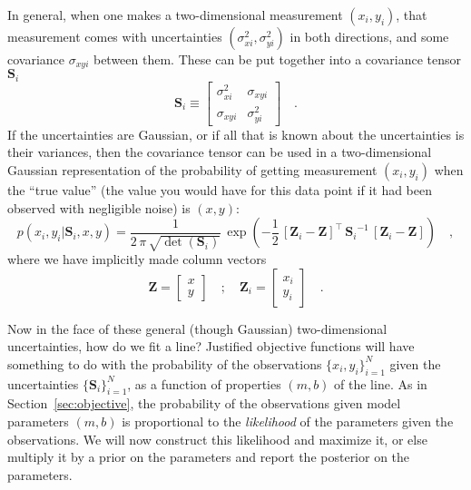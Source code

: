 \documentclass[12pt,twoside,pdftex]{article}
\newcommand{\sectionname}{Section}
\newcommand{\mmatrix}[1]{\boldsymbol{#1}}
\newcommand{\inverse}[1]{{#1}^{-1}}
\newcommand{\transpose}[1]{{#1}^{\scriptscriptstyle \top}}
\newcommand{\mS}{\mmatrix{S}}
\newcommand{\mZ}{\mmatrix{Z}}
\newcommand{\setofall}[3]{\{{#1}\}_{{#2}}^{{#3}}}
\newcommand{\allxy}{\setofall{x_i,y_i}{i=1}{N}}
\newcommand{\allS}{\setofall{\mS_i}{i=1}{N}}
\begin{document}
In general, when one makes a two-dimensional measurement $(x_i,y_i)$,
that measurement comes with uncertainties $(\sigma_{xi}^2,\sigma_{yi}^2)$
in both directions, and some covariance $\sigma_{xyi}$ between them.
These can be put together into a covariance tensor $\mS_i$
\begin{equation}
\mS_i \equiv \left[\begin{array}{cc}
\sigma_{xi}^2 & \sigma_{xyi} \\ \sigma_{xyi} & \sigma_{yi}^2
\end{array}\right] \quad .
\end{equation}
If the uncertainties are Gaussian, or if all that is known about the
uncertainties is their variances, then the covariance tensor can be
used in a two-dimensional Gaussian representation of the probability
of getting measurement $(x_i,y_i)$ when the ``true value'' (the value
you would have for this data point if it had been observed with
negligible noise) is $(x,y)$:
\begin{equation}
p(x_i,y_i|\mS_i,x,y) = \frac{1}{2\,\pi\,\sqrt{\det(\mS_i)}}
  \,\exp\left(-\frac{1}{2}\,\transpose{\left[\mZ_i - \mZ\right]}
  \,\inverse{\mS_i}\,\left[\mZ_i - \mZ\right]\right) \quad ,
\end{equation}
where we have implicitly made column vectors
\begin{equation}\label{eq:mZ}
\mZ = \left[\begin{array}{c} x \\ y \end{array}\right] \quad ; \quad
\mZ_i = \left[\begin{array}{c} x_i \\ y_i \end{array}\right] \quad .
\end{equation}

Now in the face of these general (though Gaussian) two-dimensional
uncertainties, how do we fit a line?  Justified objective functions
will have something to do with the probability of the observations
$\allxy$ given the uncertainties $\allS$, as a function of properties
$(m,b)$ of the line.  As in \sectionname~\ref{sec:objective}, the
probability of the observations given model parameters $(m,b)$ is
proportional to the \emph{likelihood} of the parameters given the
observations.  We will now construct this likelihood and maximize it,
or else multiply it by a prior on the parameters and report the
posterior on the parameters.
\end{document}
